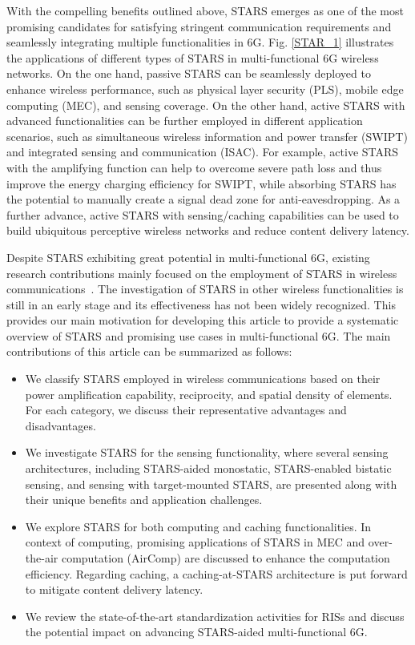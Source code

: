 \documentclass[journal]{IEEEtran}
\theoremstyle{definition}
\begin{document}
With the compelling benefits outlined above, STARS emerges as one of the most promising candidates for satisfying stringent communication requirements and seamlessly integrating multiple functionalities in 6G. Fig. \ref{STAR_1} illustrates the applications of different types of STARS in multi-functional 6G wireless networks. On the one hand, passive STARS can be seamlessly deployed to enhance wireless performance, such as physical layer security (PLS), mobile edge computing (MEC), and sensing coverage. On the other hand, active STARS with advanced functionalities can be further employed in different application scenarios, such as simultaneous wireless information and power transfer (SWIPT) and integrated sensing and communication (ISAC). For example, active STARS with the amplifying function can help to overcome severe path loss and thus improve the energy charging efficiency for SWIPT, while absorbing STARS has the potential to manually create a signal dead zone for anti-eavesdropping. As a further advance, active STARS with sensing/caching capabilities can be used to build ubiquitous perceptive wireless networks and reduce content delivery latency. 

Despite STARS exhibiting great potential in multi-functional 6G, existing research contributions mainly focused on the employment of STARS in wireless communications~\cite{9570143}. The investigation of STARS in other wireless functionalities is still in an early stage and its effectiveness has not been widely recognized. This provides our main motivation for developing this article to provide a systematic overview of STARS and promising use cases in multi-functional 6G. The main contributions of this article can be summarized as follows:
\begin{itemize}	
	\item We classify STARS employed in wireless communications based on their power amplification capability, reciprocity, and spatial density of elements. For each category, we discuss their representative advantages and disadvantages. 
    \item We investigate STARS for the sensing functionality, where several sensing architectures, including STARS-aided monostatic, STARS-enabled bistatic sensing, and sensing with target-mounted STARS, are presented along with their unique benefits and application challenges.
    \item We explore STARS for both computing and caching functionalities. In context of computing, promising applications of STARS in MEC and over-the-air computation (AirComp) are discussed to enhance the computation efficiency. Regarding caching, a caching-at-STARS architecture is put forward to mitigate content delivery latency.
    \item We review the state-of-the-art standardization activities for RISs and discuss the potential impact on advancing STARS-aided multi-functional 6G.
\end{itemize}
\end{document}
